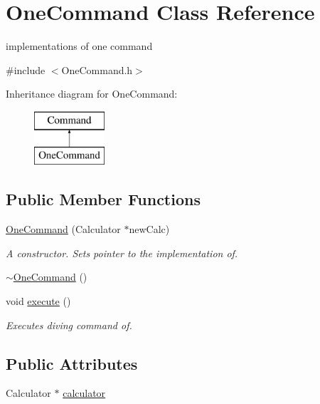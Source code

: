 \hypertarget{class_one_command}{}\section{One\+Command Class Reference}
\label{class_one_command}


implementations of one command  




{\ttfamily \#include $<$One\+Command.\+h$>$}

Inheritance diagram for One\+Command\+:\begin{figure}[H]
\begin{center}
\leavevmode
\includegraphics[height=2.000000cm]{class_one_command}
\end{center}
\end{figure}
\subsection*{Public Member Functions}
\begin{DoxyCompactItemize}
\item 
\hyperlink{class_one_command_a20db00d94b5c1d86603be7d91fcd0303}{One\+Command} (Calculator $\ast$new\+Calc)
\begin{DoxyCompactList}\small\item\em A constructor. Sets pointer to the implementation of. \end{DoxyCompactList}\item 
\hyperlink{class_one_command_a0e27a8696729eee5f0e0e399519b2237}{$\sim$\+One\+Command} ()
\item 
void \hyperlink{class_one_command_a5a044d694cd01f447d1f57ac25dccd01}{execute} ()
\begin{DoxyCompactList}\small\item\em Executes diving command of. \end{DoxyCompactList}\end{DoxyCompactItemize}
\subsection*{Public Attributes}
\begin{DoxyCompactItemize}
\item 
Calculator $\ast$ \hyperlink{class_one_command_a8867d5fb2fd62bfcd2a7d9f69bf08d93}{calculator}
\end{DoxyCompactItemize}


